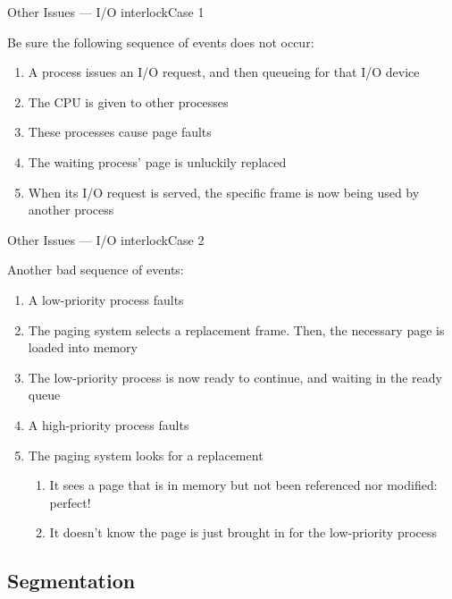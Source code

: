 \begin{frame}{Other Issues --- I/O interlock}{Case 1}
  \begin{block}{Be sure the following sequence of events does not occur:}
    \begin{enumerate}
    \item A process issues an I/O request, and then queueing for that I/O device
    \item The CPU is given to other processes
    \item These processes cause page faults
    \item The waiting process' page is unluckily replaced
    \item When its I/O request is served, the specific frame is now being used by another
      process
    \end{enumerate}
  \end{block}
\end{frame}

\begin{frame}{Other Issues --- I/O interlock}{Case 2}
  
  \begin{block}{Another bad sequence of events:}
    \begin{enumerate}
    \item A low-priority process faults
    \item The paging system selects a replacement frame. Then, the necessary page is
      loaded into memory
    \item The low-priority process is now ready to continue, and waiting in the ready
      queue
    \item A high-priority process faults
    \item The paging system looks for a replacement
      \begin{enumerate}
      \item It sees a page that is in memory but not been referenced nor modified:
        perfect!
      \item It doesn't know the page is just brought in for the low-priority process
      \end{enumerate}
    \end{enumerate}
  \end{block}
\end{frame}

\subsection{Segmentation}

